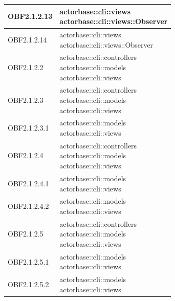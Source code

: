 \documentclass{scalatekids-article}
\begin{document}
\begin{longtable}[H]{|p{6cm}|p{11cm}|}
\hline
OBF2.1.2.13 & \multiLineCell[t]{actorbase::cli::views\\actorbase::cli::views::Observer\\}\\
\hline
OBF2.1.2.14 & \multiLineCell[t]{actorbase::cli::views\\actorbase::cli::views::Observer\\}\\
\hline
OBF2.1.2.2 & \multiLineCell[t]{actorbase::cli::controllers\\actorbase::cli::models\\actorbase::cli::views\\}\\
\hline
OBF2.1.2.3 & \multiLineCell[t]{actorbase::cli::controllers\\actorbase::cli::models\\actorbase::cli::views\\}\\
\hline
OBF2.1.2.3.1 & \multiLineCell[t]{actorbase::cli::models\\actorbase::cli::views\\}\\
\hline
OBF2.1.2.4 & \multiLineCell[t]{actorbase::cli::controllers\\actorbase::cli::models\\actorbase::cli::views\\}\\
\hline
OBF2.1.2.4.1 & \multiLineCell[t]{actorbase::cli::models\\actorbase::cli::views\\}\\
\hline
OBF2.1.2.4.2 & \multiLineCell[t]{actorbase::cli::models\\actorbase::cli::views\\}\\
\hline
OBF2.1.2.5 & \multiLineCell[t]{actorbase::cli::controllers\\actorbase::cli::models\\actorbase::cli::views\\}\\
\hline
OBF2.1.2.5.1 & \multiLineCell[t]{actorbase::cli::models\\actorbase::cli::views\\}\\
\hline
OBF2.1.2.5.2 & \multiLineCell[t]{actorbase::cli::models\\actorbase::cli::views\\}\\

\end{longtable}
\end{document}
